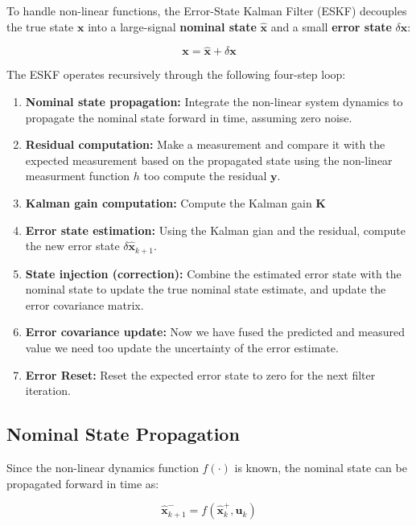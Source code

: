 \documentclass{article}
\begin{document}
	To handle non-linear functions, the Error-State Kalman Filter (ESKF) decouples the true state $\mathbf{x}$ into a large-signal \textbf{nominal state} $\hat{\mathbf{x}}$ and a small \textbf{error state} $\delta\mathbf{x}$:
	
	\begin{equation}
		\mathbf{x} = \hat{\mathbf{x}} + \delta\mathbf{x}
	\end{equation}
	
	The ESKF operates recursively through the following four-step loop:
	\begin{enumerate}
		\item \textbf{Nominal state propagation:} Integrate the non-linear system dynamics to propagate the nominal state forward in time, assuming zero noise.
		\item \textbf{Residual computation:} Make a measurement and compare it with the expected measurement based on the propagated state using the non-linear measurment function $h$ too compute the residual $\mathbf{y}$.
		\item \textbf{Kalman gain computation:} Compute the Kalman gain $\mathbf{K}$
		\item \textbf{Error state estimation:} Using the Kalman gian and the residual, compute the new error state $\delta\hat{\mathbf{x}}_{k+1}$.
		\item \textbf{State injection (correction):} Combine the estimated error state with the nominal state to update the true nominal state estimate, and update the error covariance matrix.
		\item \textbf{Error covariance update:} Now we have fused the predicted and measured value we need too update the uncertainty of the error estimate.
		\item \textbf{Error Reset:} Reset the expected error state to zero for the next filter iteration.
	\end{enumerate}
	
	\subsection{Nominal State Propagation}
	
	Since the non-linear dynamics function $f(\cdot)$ is known, the nominal state can be propagated forward in time as:
	
	\begin{equation}
		\hat{\mathbf{x}}_{k+1}^- = f(\hat{\mathbf{x}}_k^+, \mathbf{u}_k)
	\end{equation}
	
\end{document}
